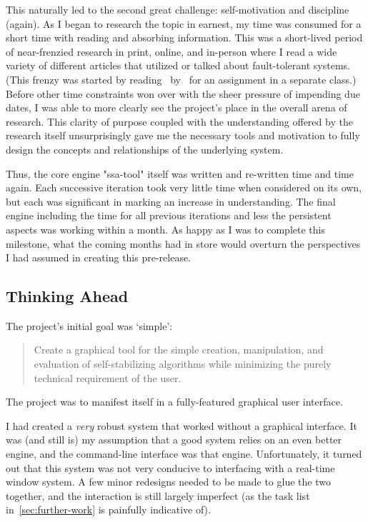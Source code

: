This naturally led to the second great challenge: self-motivation and discipline (again).
As I began to research the topic in earnest,
  my time was consumed for a short time with reading and absorbing information.
This was a short-lived period of near-frenzied research
  \Dash in print, online, and in-person \Dash
  where I read a wide variety of different articles that utilized or talked about fault-tolerant systems.
(This frenzy was started by reading~
  by~\citeauthor{goddard:ssa--k-distance} for an assignment in a separate class.)
Before other time constraints won over with the sheer pressure of impending due dates,
  I was able to more clearly see the project's place in the overall arena of research.
This clarity of purpose \Dash
  coupled with the understanding offered by the research itself \Dash
  unsurprisingly gave me the necessary tools and motivation to fully design
  the concepts and relationships of the underlying system.

Thus, the core engine \Dash "ssa-tool" itself \Dash was written and re-written time and time again.
Each successive iteration took very little time when considered on its own,
  but each was significant in marking an increase in understanding.
The final engine \Dash
  including the time for all previous iterations and less the persistent aspects \Dash
  was working within a month.
As happy as I was to complete this milestone,
  what the coming months had in store would
  overturn the perspectives I had assumed
  in creating this pre-release.

\subsection{Thinking Ahead}

The project's initial goal was \enquote*{simple}:
\begin{quote}
  Create a graphical tool for the simple creation, manipulation,
    and evaluation of self-stabilizing algorithms
    while minimizing the purely technical requirement of the user.
\end{quote}
The project was to manifest itself in a fully-featured graphical user interface.

I had created a \emph{very} robust system that worked without a graphical interface.
It was (and still is) my assumption that a good system relies on an even better engine,
  and the command-line interface was that engine.
Unfortunately, it turned out that this system was not very conducive
  to interfacing with a real-time window system.
A few minor redesigns needed to be made to glue the two together,
  and the interaction is still largely imperfect
  (as the task list in~\autoref{sec:further-work} is painfully indicative of).

